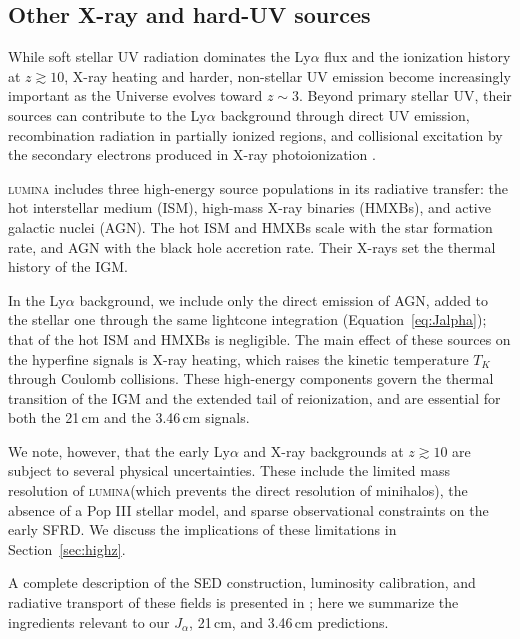 \documentclass[apj,twocolumn, appendixfloats, twocolappendix, numberedappendix, tighten]{openjournal}
\DeclareRobustCommand{\lumina}{\mbox{\textsc{lumina}}\xspace}
\begin{document}
\begin{appendix}
\subsection{Other X-ray and hard-UV sources} \label{sec:others}


While soft stellar UV radiation dominates the Ly$\alpha$ flux and the ionization history at $z \gtrsim 10$, X-ray heating and harder, non-stellar UV emission become increasingly important as the Universe evolves toward $z \sim 3$. Beyond primary stellar UV, their sources can contribute to the Ly$\alpha$ background through direct UV emission, recombination radiation in partially ionized regions, and collisional excitation by the secondary electrons produced in X-ray photoionization \citep{Madau1997}.

\lumina includes three high-energy source populations in its radiative transfer: the hot interstellar medium (ISM), high-mass X-ray binaries (HMXBs), and active galactic nuclei (AGN). The hot ISM and HMXBs scale with the star formation rate, and AGN with the black hole accretion rate. Their X-rays set the thermal history of the IGM.

In the Ly$\alpha$ background, we include only the direct emission of AGN, added to the stellar one through the same lightcone integration (Equation~\ref{eq:Jalpha}); that of the hot ISM and HMXBs is negligible. The main effect of these sources on the hyperfine signals is X-ray heating, which raises the kinetic temperature $T_K$ through Coulomb collisions. These high-energy components govern the thermal transition of the IGM and the extended tail of reionization, and are essential for both the 21\,cm and the 3.46\,cm signals.

We note, however, that the early Ly$\alpha$ and X-ray backgrounds at $z \gtrsim 10$ are subject to several physical uncertainties. These include the limited mass resolution of \lumina (which prevents the direct resolution of minihalos), the absence of a Pop III stellar model, and sparse observational constraints on the early SFRD. We discuss the implications of these limitations in Section~\ref{sec:highz}.

A complete description of the SED construction, luminosity calibration, and radiative transport of these fields is presented in \citet{Zier2026}; here we summarize the ingredients relevant to our $J_\alpha$, 21\,cm, and 3.46\,cm predictions.







\end{appendix}
\end{document}
